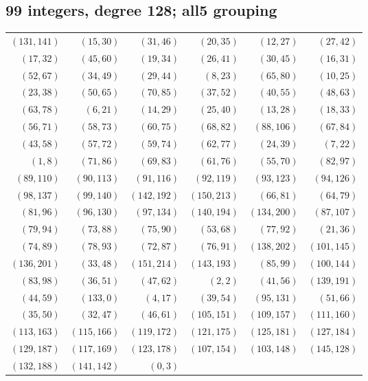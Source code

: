 \subsection*{99 integers, degree 128; all5 grouping}
\begingroup\small
\begin{longtable}{rrrrrr}
$(131,141)$ & $(15,30)$ & $(31,46)$ & $(20,35)$ & $(12,27)$ & $(27,42)$\\
$(17,32)$ & $(45,60)$ & $(19,34)$ & $(26,41)$ & $(30,45)$ & $(16,31)$\\
$(52,67)$ & $(34,49)$ & $(29,44)$ & $(8,23)$ & $(65,80)$ & $(10,25)$\\
$(23,38)$ & $(50,65)$ & $(70,85)$ & $(37,52)$ & $(40,55)$ & $(48,63)$\\
$(63,78)$ & $(6,21)$ & $(14,29)$ & $(25,40)$ & $(13,28)$ & $(18,33)$\\
$(56,71)$ & $(58,73)$ & $(60,75)$ & $(68,82)$ & $(88,106)$ & $(67,84)$\\
$(43,58)$ & $(57,72)$ & $(59,74)$ & $(62,77)$ & $(24,39)$ & $(7,22)$\\
$(1,8)$ & $(71,86)$ & $(69,83)$ & $(61,76)$ & $(55,70)$ & $(82,97)$\\
$(89,110)$ & $(90,113)$ & $(91,116)$ & $(92,119)$ & $(93,123)$ & $(94,126)$\\
$(98,137)$ & $(99,140)$ & $(142,192)$ & $(150,213)$ & $(66,81)$ & $(64,79)$\\
$(81,96)$ & $(96,130)$ & $(97,134)$ & $(140,194)$ & $(134,200)$ & $(87,107)$\\
$(79,94)$ & $(73,88)$ & $(75,90)$ & $(53,68)$ & $(77,92)$ & $(21,36)$\\
$(74,89)$ & $(78,93)$ & $(72,87)$ & $(76,91)$ & $(138,202)$ & $(101,145)$\\
$(136,201)$ & $(33,48)$ & $(151,214)$ & $(143,193)$ & $(85,99)$ & $(100,144)$\\
$(83,98)$ & $(36,51)$ & $(47,62)$ & $(2,2)$ & $(41,56)$ & $(139,191)$\\
$(44,59)$ & $(133,0)$ & $(4,17)$ & $(39,54)$ & $(95,131)$ & $(51,66)$\\
$(35,50)$ & $(32,47)$ & $(46,61)$ & $(105,151)$ & $(109,157)$ & $(111,160)$\\
$(113,163)$ & $(115,166)$ & $(119,172)$ & $(121,175)$ & $(125,181)$ & $(127,184)$\\
$(129,187)$ & $(117,169)$ & $(123,178)$ & $(107,154)$ & $(103,148)$ & $(145,128)$\\
$(132,188)$ & $(141,142)$ & $(0,3)$ & & &\\
\end{longtable}
\endgroup

